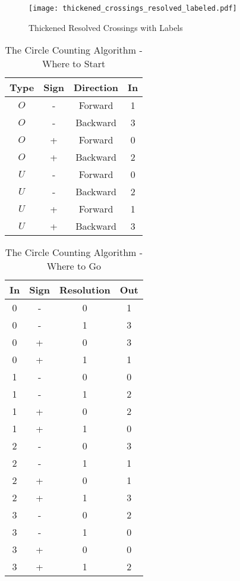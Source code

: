 \documentclass{article}
\theoremstyle{plain}
\begin{document}
        \begin{figure}
            \centering
            \texttt{[image: thickened\_crossings\_resolved\_labeled.pdf]}
            \caption{Thickened Resolved Crossings with Labels}
            \label{fig:thickened_crossings_resolved_labeled}
        \end{figure}
        \begin{table}
            \centering
            \begin{tabular}{c c c c}
                Type&Sign&Direction&In\\
                \hline
                $O$&-&Forward&1\\
                $O$&-&Backward&3\\
                $O$&+&Forward&0\\
                $O$&+&Backward&2\\
                \hline
                $U$&-&Forward&0\\
                $U$&-&Backward&2\\
                $U$&+&Forward&1\\
                $U$&+&Backward&3
            \end{tabular}
            \caption{The Circle Counting Algorithm - Where to Start}
            \label{tab:circle_counting_algorithm_where_start}
        \end{table}
        \begin{table}
            \centering
            \begin{tabular}{c c c c}
                In&Sign&Resolution&Out\\
                \hline
                0&-&0&1\\
                0&-&1&3\\
                0&+&0&3\\
                0&+&1&1\\
                \hline
                1&-&0&0\\
                1&-&1&2\\
                1&+&0&2\\
                1&+&1&0\\
                \hline
                2&-&0&3\\
                2&-&1&1\\
                2&+&0&1\\
                2&+&1&3\\
                \hline
                3&-&0&2\\
                3&-&1&0\\
                3&+&0&0\\
                3&+&1&2
            \end{tabular}
            \caption{The Circle Counting Algorithm - Where to Go}
            \label{tab:circle_counting_algorithm_where_go}
        \end{table}
\end{document}
